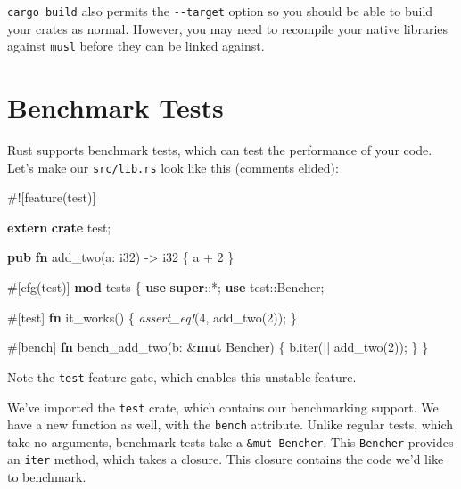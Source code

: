 \documentclass[a4paper,]{book}
\newenvironment{Shaded}{\begin{snugshade}}{\end{snugshade}}
\newcommand{\KeywordTok}[1]{\textcolor[rgb]{0.13,0.29,0.53}{\textbf{{#1}}}}
\newcommand{\DataTypeTok}[1]{\textcolor[rgb]{0.13,0.29,0.53}{{#1}}}
\newcommand{\DecValTok}[1]{\textcolor[rgb]{0.00,0.00,0.81}{{#1}}}
\newcommand{\PreprocessorTok}[1]{\textcolor[rgb]{0.56,0.35,0.01}{\textit{{#1}}}}
\newcommand{\AttributeTok}[1]{\textcolor[rgb]{0.77,0.63,0.00}{{#1}}}
\newcommand{\NormalTok}[1]{{#1}}
\begin{document}
\texttt{cargo\ build} also permits the \texttt{-\/-target} option so you
should be able to build your crates as normal. However, you may need to
recompile your native libraries against \texttt{musl} before they can be
linked against.

\section{Benchmark Tests}\label{sec--benchmark-tests}

Rust supports benchmark tests, which can test the performance of your
code. Let's make our \texttt{src/lib.rs} look like this (comments
elided):

\begin{Shaded}
\begin{Highlighting}[]
\AttributeTok{#![}\NormalTok{feature}\AttributeTok{(}\NormalTok{test}\AttributeTok{)]}

\KeywordTok{extern} \KeywordTok{crate} \NormalTok{test;}

\KeywordTok{pub} \KeywordTok{fn} \NormalTok{add_two(a: }\DataTypeTok{i32}\NormalTok{) -> }\DataTypeTok{i32} \NormalTok{\{}
    \NormalTok{a + }\DecValTok{2}
\NormalTok{\}}

\AttributeTok{#[}\NormalTok{cfg}\AttributeTok{(}\NormalTok{test}\AttributeTok{)]}
\KeywordTok{mod} \NormalTok{tests \{}
    \KeywordTok{use} \KeywordTok{super}\NormalTok{::*;}
    \KeywordTok{use} \NormalTok{test::Bencher;}

    \AttributeTok{#[}\NormalTok{test}\AttributeTok{]}
    \KeywordTok{fn} \NormalTok{it_works() \{}
        \PreprocessorTok{assert_eq!}\NormalTok{(}\DecValTok{4}\NormalTok{, add_two(}\DecValTok{2}\NormalTok{));}
    \NormalTok{\}}

    \AttributeTok{#[}\NormalTok{bench}\AttributeTok{]}
    \KeywordTok{fn} \NormalTok{bench_add_two(b: &}\KeywordTok{mut} \NormalTok{Bencher) \{}
        \NormalTok{b.iter(|| add_two(}\DecValTok{2}\NormalTok{));}
    \NormalTok{\}}
\NormalTok{\}}
\end{Highlighting}
\end{Shaded}

Note the \texttt{test} feature gate, which enables this unstable
feature.

We've imported the \texttt{test} crate, which contains our benchmarking
support. We have a new function as well, with the \texttt{bench}
attribute. Unlike regular tests, which take no arguments, benchmark
tests take a \texttt{\&mut\ Bencher}. This \texttt{Bencher} provides an
\texttt{iter} method, which takes a closure. This closure contains the
code we'd like to benchmark.
\end{document}
